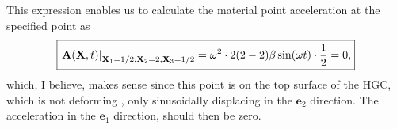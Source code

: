 This expression enables us to calculate the material point acceleration at the specified point as
\begin{equation*}
    \boxed{\left. \mathbf{A}(\mathbf{X}, t) \right\rvert_{\mathbf{X}_1 = 1/2, \mathbf{X}_2 = 2, \mathbf{X}_3 = 1/2} = \omega^2 \cdot 2 (2 - 2) \beta \sin (\omega t) \cdot \frac{1}{2} = 0,}
\end{equation*}
which, I believe, makes sense since this point is on the top surface of the HGC, which is not deforming , only sinusoidally displacing in the $\bm{e}_2$ direction. The acceleration in the $\bm{e}_1$ direction, should then be zero.

